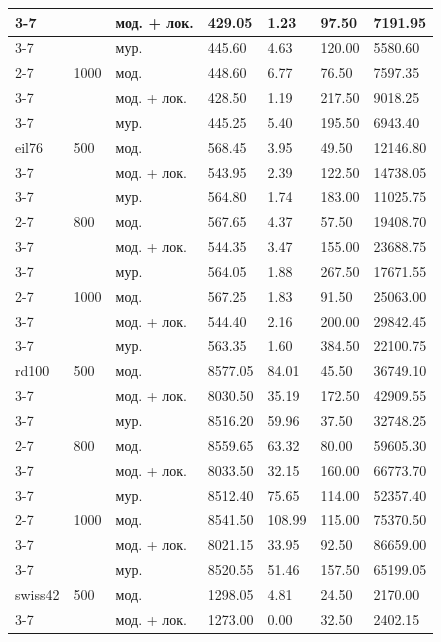 \begin{longtable}{|p{}|p{}|p{}|p{}|p{}|p{}|p{}|}
	\cline{3-7}
	& & мод. + лок. & 429.05 & 1.23 & 97.50 & 7191.95 \\
	\cline{3-7}
	& & мур. & 445.60 & 4.63 & 120.00 & 5580.60 \\
	\cline{2-7}
	& 1000 & мод. & 448.60 & 6.77 & 76.50 & 7597.35 \\
	\cline{3-7}
	& & мод. + лок. & 428.50 & 1.19 & 217.50 & 9018.25 \\
	\cline{3-7}
	& & мур. & 445.25 & 5.40 & 195.50 & 6943.40 \\
	\hline
	eil76 & 500 & мод. & 568.45 & 3.95 & 49.50 & 12146.80 \\
	\cline{3-7}
	& & мод. + лок. & 543.95 & 2.39 & 122.50 & 14738.05 \\
	\cline{3-7}
	& & мур. & 564.80 & 1.74 & 183.00 & 11025.75 \\
	\cline{2-7}
	& 800 & мод. & 567.65 & 4.37 & 57.50 & 19408.70 \\
	\cline{3-7}
	& & мод. + лок. & 544.35 & 3.47 & 155.00 & 23688.75 \\
	\cline{3-7}
	& & мур. & 564.05 & 1.88 & 267.50 & 17671.55 \\
	\cline{2-7}
	& 1000 & мод. & 567.25 & 1.83 & 91.50 & 25063.00 \\
	\cline{3-7}
	& & мод. + лок. & 544.40 & 2.16 & 200.00 & 29842.45 \\
	\cline{3-7}
	& & мур. & 563.35 & 1.60 & 384.50 & 22100.75 \\
	\hline
	rd100 & 500 & мод. & 8577.05 & 84.01 & 45.50 & 36749.10 \\
	\cline{3-7}
	& & мод. + лок. & 8030.50 & 35.19 & 172.50 & 42909.55 \\
	\cline{3-7}
	& & мур. & 8516.20 & 59.96 & 37.50 & 32748.25 \\
	\cline{2-7}
	& 800 & мод. & 8559.65 & 63.32 & 80.00 & 59605.30 \\
	\cline{3-7}
	& & мод. + лок. & 8033.50 & 32.15 & 160.00 & 66773.70 \\
	\cline{3-7}
	& & мур. & 8512.40 & 75.65 & 114.00 & 52357.40 \\
	\cline{2-7}
	& 1000 & мод. & 8541.50 & 108.99 & 115.00 & 75370.50 \\
	\cline{3-7}
	& & мод. + лок. & 8021.15 & 33.95 & 92.50 & 86659.00 \\
	\cline{3-7}
	& & мур. & 8520.55 & 51.46 & 157.50 & 65199.05 \\
	\hline
	swiss42 & 500 & мод. & 1298.05 & 4.81 & 24.50 & 2170.00 \\
	\cline{3-7}
	& & мод. + лок. & 1273.00 & 0.00 & 32.50 & 2402.15 \\

\end{longtable}

